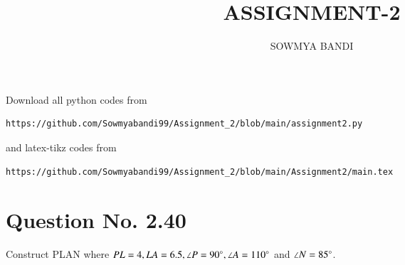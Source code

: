 \documentclass[journal,12pt,twocolumn]{IEEEtran}
\begin{document}
     \def\centbox#1{\makebox[0in]{#1}}
     \def\topbox#1{\raisebox{-\baselineskip}[0in][0in]{#1}}
     \def\midbox#1{\raisebox{-0.5\baselineskip}[0in][0in]{#1}}
\vspace{3cm}
\title{ASSIGNMENT-2}
\author{SOWMYA BANDI}
\maketitle
\newpage
\bigskip
\renewcommand{\thefigure}{\theenumi}
\renewcommand{\thetable}{\theenumi}
Download all python codes from 
\begin{lstlisting}
https://github.com/Sowmyabandi99/Assignment_2/blob/main/assignment2.py
\end{lstlisting}
%
and latex-tikz codes from 
%
\begin{lstlisting}
https://github.com/Sowmyabandi99/Assignment_2/blob/main/Assignment2/main.tex
\end{lstlisting}
%
\section{Question No. 2.40}
Construct PLAN where $PL = 4, LA = 6.5, \angle P = 90 \degree, \angle A = 110 \degree$ and $\angle N = 85 \degree$.
%
\end{document}
